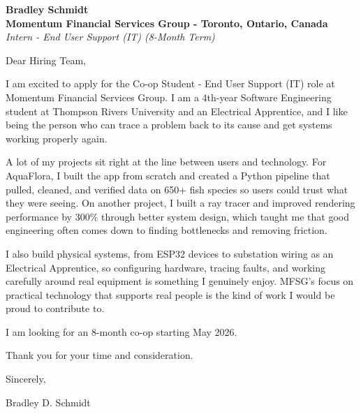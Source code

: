 \documentclass[11pt]{article}
\begin{document}
\textbf{Bradley Schmidt}\\
\vspace{0.5em}
\textbf{Momentum Financial Services Group - Toronto, Ontario, Canada}\\
\textit{Intern - End User Support (IT) (8-Month Term)}

Dear Hiring Team,

\par

I am excited to apply for the Co-op Student - End User Support (IT) role at Momentum Financial Services Group. I am a 4th-year Software Engineering student at Thompson Rivers University and an Electrical Apprentice, and I like being the person who can trace a problem back to its cause and get systems working properly again.

\par

A lot of my projects sit right at the line between users and technology. For AquaFlora, I built the app from scratch and created a Python pipeline that pulled, cleaned, and verified data on 650+ fish species so users could trust what they were seeing. On another project, I built a ray tracer and improved rendering performance by 300\% through better system design, which taught me that good engineering often comes down to finding bottlenecks and removing friction.

\par

I also build physical systems, from ESP32 devices to substation wiring as an Electrical Apprentice, so configuring hardware, tracing faults, and working carefully around real equipment is something I genuinely enjoy. MFSG's focus on practical technology that supports real people is the kind of work I would be proud to contribute to.

\par

I am looking for an 8-month co-op starting May 2026.

\par

Thank you for your time and consideration.

\par

Sincerely,

\par

Bradley D. Schmidt
\end{document}

